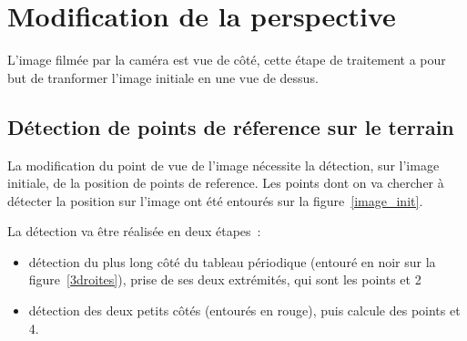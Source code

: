 \documentclass{report}
\begin{document}
\section{Modification de la perspective}
L'image filmée par la caméra est vue de côté, cette étape de traitement a pour but de tranformer l'image initiale en une vue de dessus.

\subsection{Détection de points de réference sur le terrain}
La modification du point de vue de l'image nécessite la détection, sur l'image initiale, de la position de points de reference. Les points dont on va chercher à 
détecter la position sur l'image ont été entourés sur la figure~\ref{image_init}.

La détection va être réalisée en deux étapes :
\begin{itemize}
\item détection du plus long côté du tableau périodique (entouré en noir sur la figure~\ref{3droites}), prise de ses deux extrémités, qui sont les points  et 2
\item détection des deux petits côtés (entourés en rouge), puis calcule des points  et 4.
\end{itemize}
\end{document}
